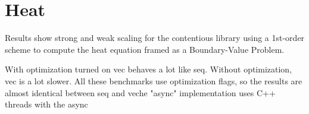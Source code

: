 \section{Heat}
Results show strong and weak scaling for the contentious library using a
1st-order scheme to compute the heat equation framed as a Boundary-Value
Problem.




With optimization turned on vec behaves a lot like seq. Without
optimization, vec is a lot slower. All these benchmarks use optimization flags,
so the results are almost identical between seq and veche "async"
implementation uses C++ threads with the async

